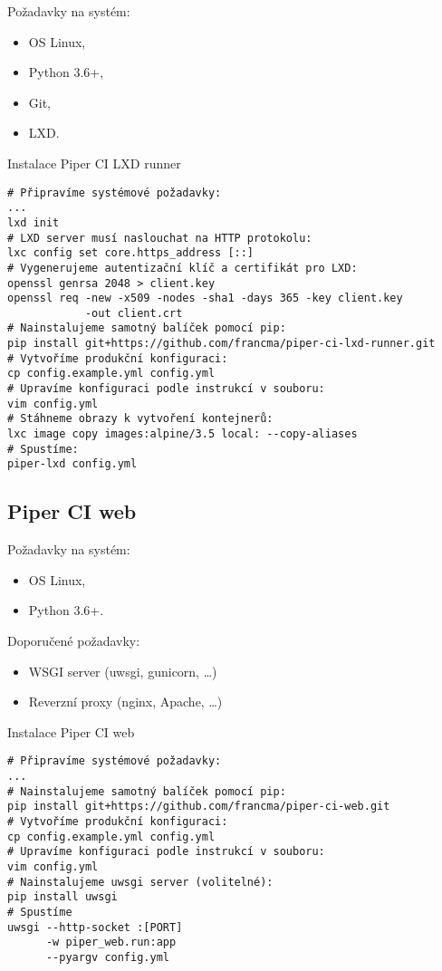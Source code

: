 Požadavky na systém:

\begin{itemize}
	\item OS Linux,
	\item Python 3.6+,
	\item Git,
	\item LXD.
\end{itemize}

\begin{listing}[H]
\caption{Instalace Piper CI LXD runner}
\begin{verbatim}
# Připravíme systémové požadavky:
...
lxd init
# LXD server musí naslouchat na HTTP protokolu:
lxc config set core.https_address [::]
# Vygenerujeme autentizační klíč a certifikát pro LXD:
openssl genrsa 2048 > client.key
openssl req -new -x509 -nodes -sha1 -days 365 -key client.key 
            -out client.crt
# Nainstalujeme samotný balíček pomocí pip:
pip install git+https://github.com/francma/piper-ci-lxd-runner.git
# Vytvoříme produkční konfiguraci:
cp config.example.yml config.yml
# Upravíme konfiguraci podle instrukcí v souboru:
vim config.yml
# Stáhneme obrazy k vytvoření kontejnerů:
lxc image copy images:alpine/3.5 local: --copy-aliases
# Spustíme:
piper-lxd config.yml
\end{verbatim}
\end{listing}


\subsection{Piper CI web}

Požadavky na systém:

\begin{itemize}
	\item OS Linux,
	\item Python 3.6+.
\end{itemize}

Doporučené požadavky:

\begin{itemize}
	\item WSGI server (uwsgi, gunicorn, \ldots)
	\item Reverzní proxy (nginx, Apache, \ldots)
\end{itemize}

\begin{listing}[H]
\caption{Instalace Piper CI web}
\begin{verbatim}
# Připravíme systémové požadavky:
...
# Nainstalujeme samotný balíček pomocí pip:
pip install git+https://github.com/francma/piper-ci-web.git
# Vytvoříme produkční konfiguraci:
cp config.example.yml config.yml
# Upravíme konfiguraci podle instrukcí v souboru:
vim config.yml
# Nainstalujeme uwsgi server (volitelné):
pip install uwsgi
# Spustíme
uwsgi --http-socket :[PORT] 
      -w piper_web.run:app
      --pyargv config.yml
\end{verbatim}
\end{listing}